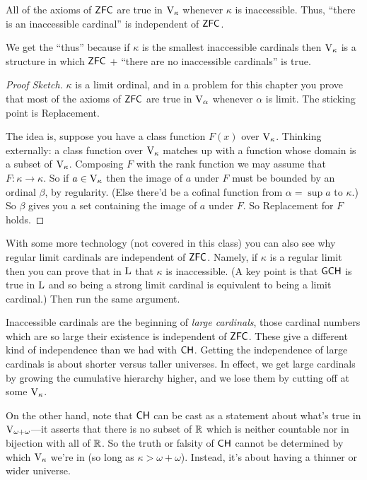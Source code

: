 \documentclass[10pt]{amsart}
\begin{document}
\begin{theorem}
All of the axioms of $\mathsf{ZFC}$ are true in $\mathrm{V}_\kappa$ whenever $\kappa$ is inaccessible. Thus, ``there is an inaccessible cardinal'' is independent of $\mathsf{ZFC}$.
\end{theorem}

We get the ``thus'' because if $\kappa$ is the smallest inaccessible cardinals then $\mathrm{V}_\kappa$ is a structure in which $\mathsf{ZFC}$ $+$ ``there are no inaccessible cardinals'' is true.

\begin{proof}[Proof Sketch]
$\kappa$ is a limit ordinal, and in a problem for this chapter you prove that most of the axioms of $\mathsf{ZFC}$ are true in $\mathrm{V}_\alpha$ whenever $\alpha$ is limit. The sticking point is Replacement.

The idea is, suppose you have a class function $F(x)$ over $\mathrm{V}_\kappa$. Thinking externally: a class function over $\mathrm{V}_\kappa$ matches up with a function whose domain is a subset of $\mathrm{V}_\kappa$. Composing $F$ with the rank function we may assume that $F : \kappa \to \kappa$. So if $a \in \mathrm{V}_\kappa$ then the image of $a$ under $F$ must be bounded by an ordinal $\beta$, by regularity. (Else there'd be a cofinal function from $\alpha = \sup a$ to $\kappa$.) So $\beta$ gives you a set containing the image of $a$ under $F$. So Replacement for $F$ holds.
\end{proof}

\begin{remark}
With some more technology (not covered in this class) you can also see why regular limit cardinals are independent of $\mathsf{ZFC}$. Namely, if $\kappa$ is a regular limit then you can prove that in $\mathrm{L}$ that $\kappa$ is inaccessible. (A key point is that $\mathsf{GCH}$ is true in $\mathrm{L}$ and so being a strong limit cardinal is equivalent to being a limit cardinal.) Then run the same argument.
\end{remark}

Inaccessible cardinals are the beginning of \emph{large cardinals}, those cardinal numbers which are so large their existence is independent of $\mathsf{ZFC}$. These give a different kind of independence than we had with $\mathsf{CH}$. Getting the independence of large cardinals is about shorter versus taller universes. In effect, we get large cardinals by growing the cumulative hierarchy higher, and we lose them by cutting off at some $\mathrm{V}_\kappa$.

On the other hand, note that $\mathsf{CH}$ can be cast as a statement about what's true in $\mathrm{V}_{\omega + \omega}$---it asserts that there is no subset of $\mathbb{R}$ which is neither countable nor in bijection with all of $\mathbb{R}$. So the truth or falsity of $\mathsf{CH}$ cannot be determined by which $\mathrm{V}_\kappa$ we're in (so long as $\kappa > \omega + \omega$). Instead, it's about having a thinner or wider universe.
\end{document}
